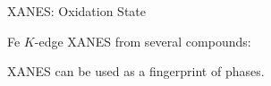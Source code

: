 \begin{slide}{XANES: Oxidation State}

  Fe  $K$-edge XANES from several compounds:

  \begin{cenpage}{95mm}
    {}
  \end{cenpage}

  \begin{postitbox}{66mm}    XANES can be used as a fingerprint of phases.  \end{postitbox}


\end{slide}
